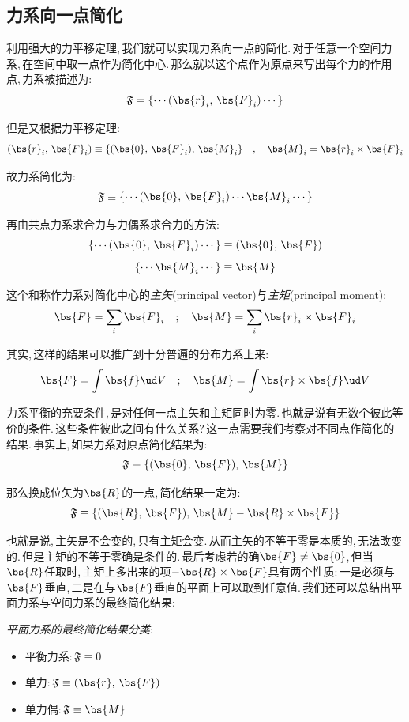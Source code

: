\vspace{1.2cm}

\subsection{力系向一点简化}

利用强大的力平移定理,\,我们就可以实现力系向一点的简化.\,对于任意一个空间力系,\,在空间中取一点作为简化中心.\,那么就以这个点作为原点来写出每个力的作用点,\,力系被描述为:
\[\mathfrak{F}=\{\cdots(\bs{r}_i,\,\bs{F}_i)\cdots\}\]

但是又根据力平移定理:
\[(\bs{r}_i,\,\bs{F}_i)\equiv\{(\bs{0},\,\bs{F}_i),\,\bs{M}_i\}\quad,\quad \bs{M}_i=\bs{r}_i\times\bs{F}_i\]

故力系简化为:
\[\mathfrak{F}\equiv\{\cdots(\bs{0},\,\bs{F}_i)\cdots\bs{M}_i\cdots\}\]

再由共点力系求合力与力偶系求合力的方法:
\[\{\cdots(\bs{0},\,\bs{F}_i)\cdots\}\equiv(\bs{0},\,\bs{F})\]
\[\{\cdots\bs{M}_i\cdots\}\equiv\bs{M}\]

这个和称作力系对简化中心的\emph{主矢}(principal vector)与\emph{主矩}(principal moment):
\[\bs{F}=\sum_i\bs{F}_i\quad;\quad \bs{M}=\sum_i\bs{r}_i\times\bs{F}_i\]

其实,\,这样的结果可以推广到十分普遍的分布力系上来:
\[\bs{F}=\int\bs{f}\ud V\quad;\quad\bs{M}=\int\bs{r}\times\bs{f}\ud V\]

力系平衡的充要条件,\,是对任何一点主矢和主矩同时为零.\,也就是说有无数个彼此等价的条件.\,这些条件彼此之间有什么关系?\,这一点需要我们考察对不同点作简化的结果.\,事实上,\,如果力系对原点简化结果为:
\[\mathfrak{F}\equiv\{(\bs{0},\,\bs{F}),\,\bs{M}\}\]

那么换成位矢为$\bs{R}$的一点,\,简化结果一定为:
\[\mathfrak{F}\equiv\{(\bs{R},\,\bs{F}),\,\bs{M}-\bs{R}\times\bs{F}\}\]

也就是说,\,主矢是不会变的,\,只有主矩会变.\,从而主矢的不等于零是本质的,\,无法改变的.\,但是主矩的不等于零确是条件的.\,最后考虑若的确$\bs{F}\neq \bs{0}$,\,但当$\bs{R}$任取时,\,主矩上多出来的项$-\bs{R}\times\bs{F}$具有两个性质:\,一是必须与$\bs{F}$垂直,\,二是在与$\bs{F}$垂直的平面上可以取到任意值.\,我们还可以总结出平面力系与空间力系的最终简化结果:

\vspace{0.5cm}

\emph{平面力系的最终简化结果分类}:
\begin{itemize}
	\item 平衡力系:\,$\mathfrak{F}\equiv\mathfrak{0}$
	\item 单力:\,$\mathfrak{F}\equiv(\bs{r},\,\bs{F})$
	\item 单力偶:\,$\mathfrak{F}\equiv\bs{M}$
\end{itemize}

